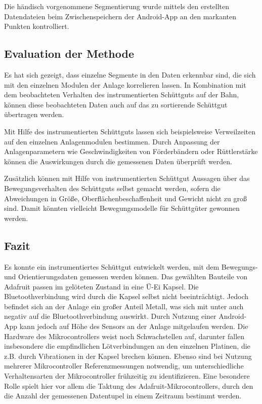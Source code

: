 Die händisch vorgenommene Segmentierung wurde mittels den erstellten Datendateien beim Zwischenspeichern der Android-App an den markanten Punkten kontrolliert.

\subsection{Evaluation der Methode}

Es hat sich gezeigt, dass einzelne Segmente in den Daten erkennbar sind, die sich mit den einzelnen Modulen der Anlage korrelieren lassen. In Kombination mit dem beobachteten Verhalten des instrumentierten Schüttguts auf der Bahn, können diese beobachteten Daten auch auf das zu sortierende Schüttgut übertragen werden. 

Mit Hilfe des instrumentierten Schüttguts lassen sich beispielsweise Verweilzeiten auf den einzelnen Anlagenmodulen bestimmen. Durch Anpassung der Anlagenparametern wie Geschwindigkeiten von Förderbändern oder Rüttlerstärke können die Auswirkungen durch die gemessenen Daten überprüft werden.

Zusätzlich können mit Hilfe von instrumentierten Schüttgut Aussagen über das Bewegungsverhalten des Schüttguts selbst gemacht werden, sofern die Abweichungen in Größe, Oberflächenbeschaffenheit und Gewicht nicht zu groß sind. Damit könnten vielleicht Bewegungsmodelle für Schüttgüter gewonnen werden.

\subsection{Fazit}

Es konnte ein instrumentiertes Schüttgut entwickelt werden, mit dem Bewegungs- und Orientierungsdaten gemessen werden können. Das gewählten Bauteile von Adafruit passen im gelöteten Zustand in eine Ü-Ei Kapsel. Die Bluetoothverbindung wird durch die Kapsel selbst nicht beeinträchtigt. Jedoch befindet sich an der Anlage ein großer Anteil Metall, was sich mit unter auch negativ auf die Bluetoothverbindung auswirkt. Durch Nutzung einer Android-App kann jedoch auf Höhe des Sensors an der Anlage mitgelaufen werden. Die Hardware des Mikrocontrollers weist noch Schwachstellen auf, darunter fallen insbesondere die empfindlichen Lötverbindungen an den einzelnen Platinen, die z.B. durch Vibrationen in der Kapsel brechen können. Ebenso sind bei Nutzung mehrerer Mikrocontroller Referenzmessungen notwendig, um unterschiedliche Verhaltensarten der Mikrocontroller frühzeitig zu identifizieren. Eine besondere Rolle spielt hier vor allem die Taktung des Adafruit-Mikrocontrollers, durch den die Anzahl der gemessenen Datentupel in einem Zeitraum bestimmt werden.

